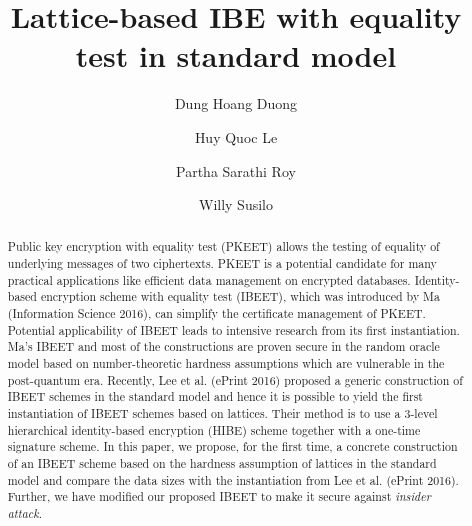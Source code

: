 \documentclass[runningheads]{llncs}
\providecommand{\keywords}[1]{\textbf{\textit{Key words: }} #1}
\begin{document}
	\title{Lattice-based IBE with equality test in standard model}
	\author{Dung Hoang Duong \and Huy Quoc Le \and Partha Sarathi Roy \and Willy Susilo}
	
	
	\maketitle              
	
	\begin{abstract}
		Public key encryption with equality test (PKEET) allows the testing of equality of underlying messages of two ciphertexts. PKEET is a potential candidate for many practical applications like efficient data management on encrypted databases. Identity-based encryption scheme with equality test (IBEET), which was introduced by Ma (Information Science 2016), can simplify the certificate management of PKEET. Potential applicability of IBEET leads to intensive research from its first instantiation. Ma's IBEET and most of the constructions are proven secure in the random oracle model based on number-theoretic hardness assumptions which are vulnerable in the post-quantum era. Recently, Lee et al. (ePrint 2016) proposed a generic construction of IBEET schemes in the standard model and hence it is possible to yield the first instantiation of IBEET schemes based on lattices. Their method is to use a $3$-level hierarchical identity-based encryption (HIBE) scheme together with a one-time signature scheme. In this paper, we propose, for the first time, a concrete construction of an IBEET scheme based on the hardness assumption of lattices in the standard model and compare the data sizes with the instantiation from Lee et al. (ePrint 2016). Further, we have modified our proposed IBEET to make it secure against {\em insider attack}. %
	
	\end{abstract}
\end{document}
